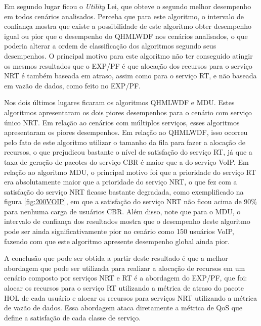 Em segundo lugar ficou o \textit{Utility} Lei, que obteve o segundo melhor desempenho em todos cenários analisados. Perceba que para este algoritmo, o intervalo de confiança mostra que existe a possibilidade de este algoritmo obter desempenho igual ou pior que o desempenho do QHMLWDF nos cenários analisados, o que poderia alterar a ordem de classificação dos algoritmos segundo seus desempenhos. O principal motivo para este algoritmo não ter conseguido atingir os mesmos resultados que o EXP/PF é que alocação dos recursos para o serviço NRT é também baseada em atraso, assim como para o serviço RT, e não baseada em vazão de dados, como feito no EXP/PF.
 
Nos dois últimos lugares ficaram os algoritmos QHMLWDF e MDU. Estes algoritmos apresentaram os dois piores desempenhos para o cenário com serviço único NRT. Em relação ao cenários com múltiplos serviços, esses algoritmos apresentaram os piores desempenhos. Em relação ao QHMLWDF, isso ocorreu pelo fato de este algoritmo utilizar o tamanho da fila para fazer a alocação de recursos, o que prejudicou bastante o nível de satisfação do serviço RT, já que a taxa de geração de pacotes do serviço CBR é maior que a do serviço VoIP. Em relação ao algoritmo MDU, o principal motivo foi que a prioridade do serviço RT era absolutamente maior que a prioridade do serviço NRT, o que fez com a satisfação do serviço NRT ficasse bastante degradada, como exemplificado na figura \ref{fig:200VOIP}, em que a satisfação do serviço NRT não ficou acima de 90\% para nenhuma carga de usuários CBR. Além disso, note que para o MDU, o intervalo de confiança dos resultados mostra que o desempenho deste algoritmo pode ser ainda significativamente pior no cenário como 150 usuários VoIP, fazendo com que este algoritmo apresente desempenho global ainda pior. 

A conclusão que pode ser obtida a partir deste resultado é que a melhor abordagem que pode ser utilizada para realizar a alocação de recursos em um cenário composto por serviços NRT e RT é a abordagem do EXP/PF, que foi: alocar os recursos para o serviço RT utilizando a métrica de atraso do pacote HOL de cada usuário e alocar os recursos para serviços NRT utilizando a métrica de vazão de dados. Essa abordagem ataca diretamente a métrica de QoS que define a satisfação de cada classe de serviço.